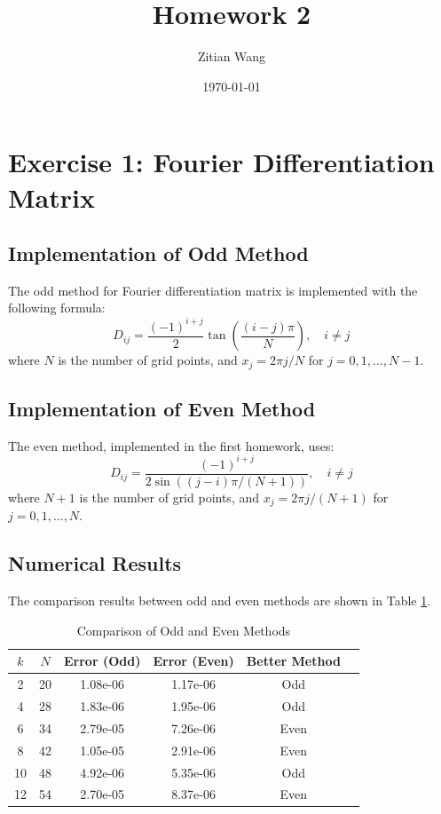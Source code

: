 \documentclass{article}
\title{Homework 2}
\author{Zitian Wang}
\date{\today}
\begin{document}
\maketitle

\section{Exercise 1: Fourier Differentiation Matrix}

\subsection{Implementation of Odd Method}
The odd method for Fourier differentiation matrix is implemented with the following formula:
\begin{equation}
D_{ij} = \frac{(-1)^{i+j}}{2}\tan\left(\frac{(i-j)\pi}{N}\right), \quad i \neq j
\end{equation}
where $N$ is the number of grid points, and $x_j = 2\pi j/N$ for $j = 0,1,\dots,N-1$.

\subsection{Implementation of Even Method}
The even method, implemented in the first homework, uses:
\begin{equation}
D_{ij} = \frac{(-1)^{i+j}}{2\sin((j-i)\pi/(N+1))}, \quad i \neq j
\end{equation}
where $N+1$ is the number of grid points, and $x_j = 2\pi j/(N+1)$ for $j = 0,1,\dots,N$.

\subsection{Numerical Results}
The comparison results between odd and even methods are shown in Table \ref{tab:comparison}.

\begin{table}[h]
\centering
\caption{Comparison of Odd and Even Methods}
\label{tab:comparison}
\begin{tabular}{cccccc}
\toprule
$k$ & $N$ & Error (Odd) & Error (Even) & Better Method \\
\midrule
2 & 20 & 1.08e-06 & 1.17e-06 & Odd \\
4 & 28 & 1.83e-06 & 1.95e-06 & Odd \\
6 & 34 & 2.79e-05 & 7.26e-06 & Even \\
8 & 42 & 1.05e-05 & 2.91e-06 & Even \\
10 & 48 & 4.92e-06 & 5.35e-06 & Odd \\
12 & 54 & 2.70e-05 & 8.37e-06 & Even \\
\bottomrule
\end{tabular}
\end{table}
\end{document}
